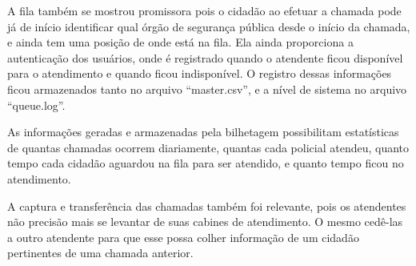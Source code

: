 A fila  também se mostrou promissora pois o cidadão ao efetuar a chamada pode já de início identificar qual órgão de segurança pública desde o início da chamada, e ainda tem uma posição de onde está na fila. Ela ainda proporciona a autenticação dos usuários, onde é registrado quando o atendente ficou disponível para o atendimento e quando ficou indisponível. O registro dessas informações ficou armazenados tanto no arquivo “master.csv”, e a nível de sistema no arquivo “queue.log”.

As informações geradas e armazenadas pela bilhetagem possibilitam estatísticas de quantas chamadas ocorrem diariamente, quantas cada policial atendeu, quanto tempo cada cidadão aguardou na fila para ser atendido, e quanto tempo ficou no atendimento.

A captura e transferência das chamadas também foi relevante, pois os atendentes não precisão mais se levantar de suas cabines de atendimento. O mesmo cedê-las a outro atendente para que esse possa colher informação de um cidadão pertinentes de uma chamada anterior. 
